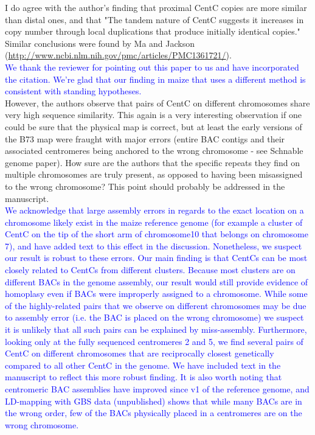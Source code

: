 \documentclass[]{article}
\newcommand{\res}[1]{\noindent \textcolor{blue}{{#1}} \\}
\begin{document}
I do agree with the author's finding that proximal CentC copies are more similar than distal ones, and that "The tandem nature of CentC suggests it increases in copy number through local duplications that produce initially identical copies." Similar conclusions were found by Ma and Jackson (\url{http://www.ncbi.nlm.nih.gov/pmc/articles/PMC1361721/}).\\

\res{We thank the reviewer for pointing out this paper to us and have incorporated the citation.  We're glad that our finding in maize that uses a different method is consistent with standing hypotheses.}

However, the authors observe that pairs of  CentC on different chromosomes share very high sequence similarity.  This again is a very interesting observation if one could be sure that the physical map is correct, but at least the early versions of the B73 map were fraught with major errors (entire BAC contigs and their associated centromeres being anchored to the wrong chromosome - see Schnable genome paper).  How sure are the authors that the specific repeats they find on multiple chromosomes are truly present, as opposed to having been misassigned to the wrong chromosome? This point should probably be addressed in the manuscript.\\

\res{We acknowledge that large assembly errors in regards to the exact location on a chromosome likely exist in the maize reference genome (for example a cluster of CentC on the tip of the short arm of chromosome10 that belongs on chromosome 7), and have added text to this effect in the discussion.  
Nonetheless, we suspect our result is robust to these errors.
Our main finding is that CentCs can be most closely related to CentCs from different clusters.
Because most clusters are on different BACs in the genome assembly, our result would still provide evidence of homoplasy even if BACs were improperly assigned to a chromosome. 
While some of the highly-related pairs that we observe on different chromosomes may be due to assembly error (i.e. the BAC is placed on the wrong chromosome) we suspect it is unlikely that all such pairs can be explained by miss-assembly.  
Furthermore, looking only at the fully sequenced centromeres 2 and 5, we find several pairs of CentC on different chromosomes that are reciprocally closest genetically compared to all other CentC in the genome.  
We have included text in the manuscript to reflect this more robust finding. 
It is also worth noting that centromeric BAC assemblies have improved since v1 of the reference genome, and LD-mapping with GBS data (unpublished) shows that while many BACs are in the wrong order, few of the BACs physically placed in a centromeres are on the wrong chromosome. }
\end{document}
